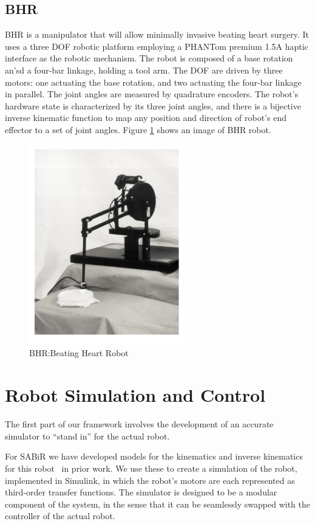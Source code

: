 \subsection{BHR}
BHR is a manipulator that will allow minimally invasive beating heart surgery\cite{bebek2008robotic}. It uses a three DOF robotic platform employing a PHANTom premium 1.5A haptic interface \cite{cavusoglu2001kinematics} as the robotic mechanism. The robot is composed of a base rotation an’sd a four-bar linkage, holding a tool arm. The DOF are driven by three motors: one actuating the base rotation, and two actuating the four-bar linkage in parallel. The joint angles are measured by quadrature encoders. The robot’s hardware state is characterized by its three joint angles, and there is a bijective inverse kinematic function to map any position and direction of robot’s end effector to a set of joint angles. Figure \ref{bhr} shows an image of BHR robot.

\begin{figure}[!thpb]
\centering
\includegraphics[width=0.6\textwidth]{chapter5_BHR.pdf}
\caption{BHR:Beating Heart Robot}
\label{bhr}
\end{figure}

\section{Robot Simulation and Control}\label{robotsimulator}
The first part of our framework involves the development of an accurate simulator to ``stand in'' for the actual robot. 

For SABiR we have developed models for the kinematics and inverse kinematics for this robot~\cite{hwang2009kinematic} in prior work. We use these to create a simulation of the robot, implemented in Simulink, in which the robot’s motors are each represented as third-order transfer functions. The simulator is designed to be a modular component of the system, in the sense that it can be seamlessly swapped with the controller of the actual robot.

